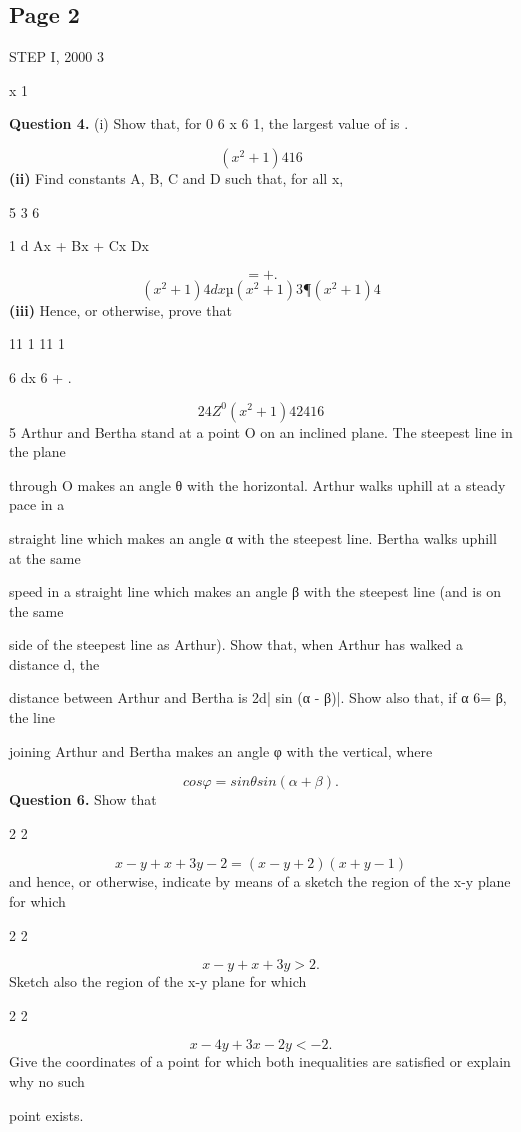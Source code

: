 \documentclass[12pt]{article}
\begin{document}
\subsection*{Page 2}
\begin{flushleft}
STEP I, 2000 3\par
x 1\par
\bigskip\textbf{Question 4.} (i) Show that, for 0 6 x 6 1, the largest value of is .\par
\[(x^2 + 1)4 16\]
\textbf{(ii)} Find constants A, B, C and D such that, for all x,\par
5 3 6\par
1 d Ax + Bx + Cx Dx\par
\[= + .\]
\[(x^2 + 1)4 dx µ (x^2 + 1)3 ¶ (x^2 + 1)4\]
\textbf{(iii)} Hence, or otherwise, prove that\par
11 1 11 1\par
6 dx 6 + .\par
\[24 Z^0 (x^2 + 1)4 24 16\]
5 Arthur and Bertha stand at a point O on an inclined plane. The steepest line in the plane\par
through O makes an angle θ with the horizontal. Arthur walks uphill at a steady pace in a\par
straight line which makes an angle α with the steepest line. Bertha walks uphill at the same\par
speed in a straight line which makes an angle β with the steepest line (and is on the same\par
side of the steepest line as Arthur). Show that, when Arthur has walked a distance d, the\par
distance between Arthur and Bertha is 2d| sin (α - β)|. Show also that, if α 6= β, the line\par
joining Arthur and Bertha makes an angle φ with the vertical, where\par
\[cos φ = sin θ sin (α + β).\]
\bigskip\textbf{Question 6.} Show that\par
2 2\par
\[x - y + x + 3y - 2 = (x - y + 2)(x + y - 1)\]
and hence, or otherwise, indicate by means of a sketch the region of the x-y plane for which\par
2 2\par
\[x - y + x + 3y > 2.\]
Sketch also the region of the x-y plane for which\par
2 2\par
\[x - 4y + 3x - 2y < -2.\]
Give the coordinates of a point for which both inequalities are satisfied or explain why no such\par
point exists.\par
\end{flushleft}
\end{document}
